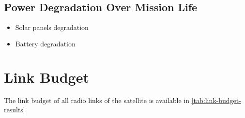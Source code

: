 \subsection{Power Degradation Over Mission Life}

\begin{itemize}
    \item Solar panels degradation
    \item Battery degradation
\end{itemize}

\section{Link Budget}

The link budget of all radio links of the satellite is available in \autoref{tab:link-budget-results}.

